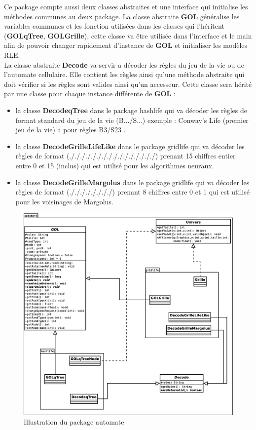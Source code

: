 \par Ce package compte aussi deux classes abstraites et une interface qui initialise les méthodes communes au deux package.
La classe abstraite \textbf{GOL} généralise les variables communes et les fonction utilisées dans les classes qui l'héritent (\textbf{GOLqTree}, \textbf{GOLGrille}), cette classe va être utilisée dans l'interface et le main afin de pouvoir changer rapidement d'instance de \textbf{GOL} et initialiser les modèles RLE. \\
La classe abstraite \textbf{Decode} va servir a décoder les règles du jeu de la vie ou de l'automate cellulaire. Elle contient les règles ainsi qu'une méthode abstraite qui doit vérifier si les règles sont valides ainsi qu'un accesseur. Cette classe sera hérité par une classe pour chaque instance différente de \textbf{GOL} : 
\begin{itemize}
    \item la classe \textbf{DecodeqTree} dans le package hashlife qui va décoder les règles de format standard du jeu de la vie (B.../S...) exemple : Conway's Life (premier jeu de la vie) a pour règles B3/S23 .
    \item la classe \textbf{DecodeGrilleLifeLike} dans le package gridlife qui va décoder les règles de format (././././././././././././././././) prenant 15 chiffres entier entre 0 et 15 (inclus) qui est utilisé pour les algorithmes neuraux.
    \item la classe \textbf{DecodeGrilleMargolus} dans le package gridlife qui va décoder les règles de format (././././././././) prenant 8 chiffres entre 0 et 1 qui est utilisé pour les voisinages de Margolus.
\end{itemize}
\begin{figure}[htp]
\centering
\includegraphics[scale=0.25]{images/Diagramme/package_automate.eps}
\caption{\label{fig:Automate}Illustration du package automate}
\end{figure}
